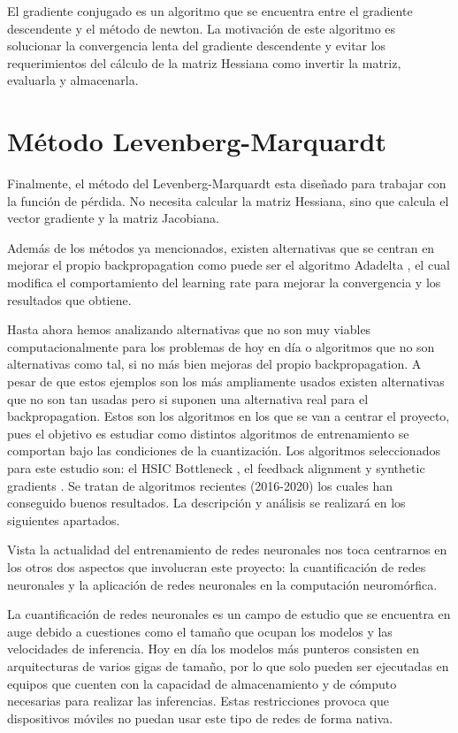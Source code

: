 El gradiente conjugado es un algoritmo que se encuentra entre el gradiente descendente y el método de newton. La motivación de este algoritmo es solucionar la convergencia lenta del gradiente descendente y evitar los requerimientos del cálculo de la matriz Hessiana como invertir la matriz, evaluarla y almacenarla. 

\section{Método Levenberg-Marquardt}

Finalmente, el método del Levenberg-Marquardt esta diseñado para trabajar con la función de pérdida. No necesita calcular la matriz Hessiana, sino que calcula el vector gradiente y la matriz Jacobiana.

Además de los métodos ya mencionados, existen alternativas que se centran en mejorar el propio backpropagation como puede ser el algoritmo Adadelta \cite{https://doi.org/10.48550/arxiv.1212.5701}, el cual modifica el comportamiento del learning rate para mejorar la convergencia y los resultados que obtiene. 

Hasta ahora hemos analizando alternativas que no son muy viables computacionalmente para los problemas de hoy en día o algoritmos que no son alternativas como tal, si no más bien mejoras del propio backpropagation. A pesar de que estos ejemplos son los más ampliamente usados existen alternativas que no son tan usadas pero si suponen una alternativa real para el backpropagation. Estos son los algoritmos en los que se van a centrar el proyecto, pues el objetivo es estudiar como distintos algoritmos de entrenamiento se comportan bajo las condiciones de la cuantización. Los algoritmos seleccionados para este estudio son:  el HSIC Bottleneck \cite{ma2020hsic}, el feedback alignment \cite{RefWorks:RefID:9-lillicrap2016random} y synthetic gradients \cite{jaderberg2017decoupled}. Se tratan de algoritmos recientes (2016-2020) los cuales han conseguido buenos resultados. La descripción y análisis se realizará en los siguientes apartados.  

Vista la actualidad del entrenamiento de redes neuronales nos toca centrarnos en los otros dos aspectos que involucran este proyecto: la cuantificación de redes neuronales y la aplicación de redes neuronales en la computación neuromórfica.

La cuantificación de redes neuronales es un campo de estudio que se encuentra en auge debido a cuestiones como el tamaño que ocupan los modelos y las velocidades de inferencia. Hoy en día los modelos más punteros consisten en arquitecturas de varios gigas de tamaño, por lo que solo pueden ser ejecutadas en equipos que cuenten con la capacidad de almacenamiento y de cómputo necesarias para realizar las inferencias. Estas restricciones provoca que dispositivos móviles no puedan usar este tipo de redes de forma nativa. 

